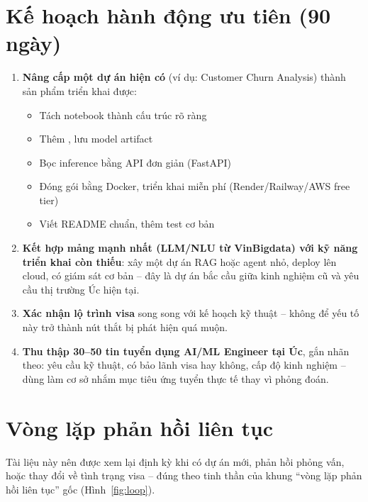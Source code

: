 \documentclass{reportkit}
\begin{document}
\section{Kế hoạch hành động ưu tiên (90 ngày)}
\begin{enumerate}
  \item \textbf{Nâng cấp một dự án hiện có} (ví dụ: Customer Churn Analysis) thành sản
    phẩm triển khai được:
    \begin{itemize}
      \item Tách notebook thành cấu trúc  rõ ràng
      \item Thêm , lưu model artifact
      \item Bọc inference bằng API đơn giản (FastAPI)
      \item Đóng gói bằng Docker, triển khai miễn phí (Render/Railway/AWS free tier)
      \item Viết README chuẩn, thêm test cơ bản
    \end{itemize}
  \item \textbf{Kết hợp mảng mạnh nhất (LLM/NLU từ VinBigdata) với kỹ năng triển khai
    còn thiếu}: xây một dự án RAG hoặc agent nhỏ, deploy lên cloud, có giám sát cơ bản
    -- đây là dự án bắc cầu giữa kinh nghiệm cũ và yêu cầu thị trường Úc hiện tại.
  \item \textbf{Xác nhận lộ trình visa} song song với kế hoạch kỹ thuật -- không để
    yếu tố này trở thành nút thắt bị phát hiện quá muộn.
  \item \textbf{Thu thập 30--50 tin tuyển dụng AI/ML Engineer tại Úc}, gắn nhãn theo:
    yêu cầu kỹ thuật, có bảo lãnh visa hay không, cấp độ kinh nghiệm -- dùng làm cơ sở
    nhắm mục tiêu ứng tuyển thực tế thay vì phỏng đoán.
\end{enumerate}

\section{Vòng lặp phản hồi liên tục}
Tài liệu này nên được xem lại định kỳ khi có dự án mới, phản hồi phỏng vấn, hoặc thay
đổi về tình trạng visa -- đúng theo tinh thần của khung ``vòng lặp phản hồi liên tục''
gốc (Hình~\ref{fig:loop}).

\begin{diagram}[
  type=cycle,
  caption={Vòng lặp cập nhật hồ sơ nghề nghiệp.},
  label={fig:loop},
  source={Minh họa khái niệm.},
  description={Bốn giai đoạn theo vòng tròn: hành động, thu thập phản hồi, cập nhật bằng chứng, đánh giá lại giả thuyết, quay lại hành động.}
]
\end{diagram}
\end{document}
